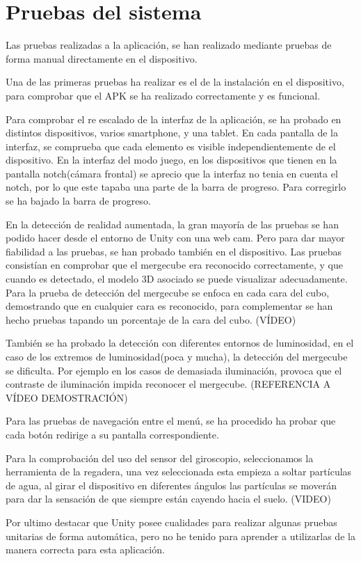 \section{Pruebas del sistema}
Las pruebas realizadas a la aplicación, se han realizado mediante pruebas de forma manual directamente en el dispositivo.

Una de las primeras pruebas ha realizar es el de la instalación en el dispositivo, para comprobar que el APK se ha realizado correctamente y es funcional. 

Para comprobar el re escalado de la interfaz de la aplicación, se ha probado en distintos dispositivos, varios smartphone, y una tablet. En cada pantalla de la interfaz, se comprueba que cada elemento es visible independientemente de el dispositivo.
En la interfaz del modo juego, en los dispositivos que tienen en la pantalla notch(cámara frontal) se aprecio que la interfaz no tenia en cuenta el notch, por lo que este tapaba una parte de la barra de progreso. Para corregirlo se ha bajado la barra de progreso.

En la detección de realidad aumentada, la gran mayoría de las pruebas se han podido hacer desde el entorno de Unity con una web cam. Pero para dar mayor fiabilidad a las pruebas, se han probado también en el dispositivo. Las pruebas consistían en comprobar que el mergecube era reconocido correctamente, y que cuando es detectado, el modelo 3D asociado se puede visualizar adecuadamente. Para la prueba de detección del mergecube se enfoca en cada cara del cubo, demostrando que en cualquier cara es reconocido, para complementar se han hecho pruebas tapando un porcentaje de la cara del cubo. (VÍDEO)

También se ha probado la detección con diferentes entornos de luminosidad, en el caso de los extremos de luminosidad(poca y mucha), la detección del mergecube se dificulta. Por ejemplo en los casos de demasiada iluminación, provoca que el contraste de iluminación impida reconocer el mergecube. (REFERENCIA A VÍDEO DEMOSTRACIÓN)

Para las pruebas de navegación entre el menú, se ha procedido ha probar que cada botón redirige a su pantalla correspondiente.

Para la comprobación del uso del sensor del giroscopio, seleccionamos la herramienta de la regadera, una vez seleccionada esta empieza a soltar partículas de agua, al girar el dispositivo en diferentes ángulos las partículas se moverán para dar la sensación de que siempre están cayendo hacia el suelo. (VIDEO)







Por ultimo destacar que Unity posee cualidades para realizar algunas pruebas unitarias de forma automática, pero no he tenido para aprender a utilizarlas de la manera correcta para esta aplicación. 